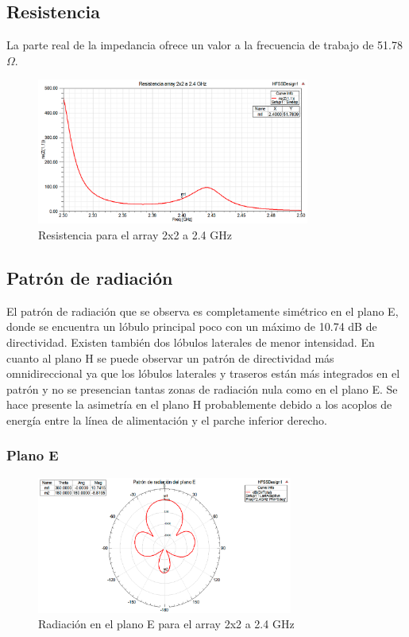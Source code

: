 \subsection{Resistencia}
\par La parte real de la impedancia ofrece un valor a la frecuencia de trabajo de 51.78 $\Omega$.
\\
\begin{figure}[H]
    \centering
        \includegraphics[width=0.8\textwidth]{archivos/analisis/2x21/3}
        \caption{Resistencia para el array 2x2 a 2.4 GHz}
        \label{fig:resis2x21}
\end{figure}

\subsection{Patrón de radiación}
\par El patrón de radiación que se observa es completamente simétrico en el plano E, donde se encuentra un lóbulo principal poco con un máximo de 10.74 dB de directividad. Existen también dos lóbulos laterales de menor intensidad. En cuanto al plano H se puede observar un patrón de directividad más omnidireccional ya que los lóbulos laterales y traseros están más integrados en el patrón y no se presencian tantas zonas de radiación nula como en el plano E. Se hace presente la asimetría en el plano H probablemente debido a los acoplos de energía entre la línea de alimentación y el parche inferior derecho.
\\
\subsubsection{Plano E}
\begin{figure}[H]
    \centering
        \includegraphics[width=0.75\textwidth]{archivos/analisis/2x21/4}
        \caption{Radiación en el plano E para el array 2x2 a 2.4 GHz}
        \label{fig:E2x21}
\end{figure}

